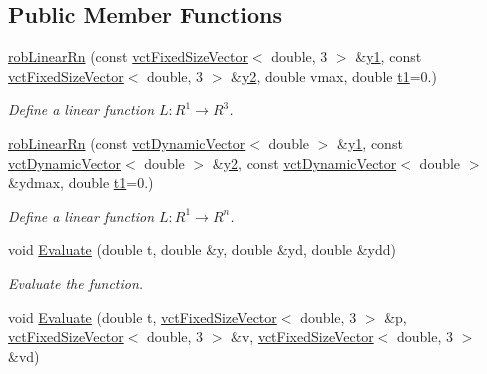 \subsection*{Public Member Functions}
\begin{DoxyCompactItemize}
\item 
\hyperlink{classrob_linear_rn_a85534f130d03d7b490b56248a661621e}{rob\+Linear\+Rn} (const \hyperlink{classvct_fixed_size_vector}{vct\+Fixed\+Size\+Vector}$<$ double, 3 $>$ \&\hyperlink{classrob_function_rn_aadf26230a697fedca000dac29ae27129}{y1}, const \hyperlink{classvct_fixed_size_vector}{vct\+Fixed\+Size\+Vector}$<$ double, 3 $>$ \&\hyperlink{classrob_function_rn_a982a35e7e6f235da34765d3ceeb91109}{y2}, double vmax, double \hyperlink{classrob_function_a9a4b408a3a5a8ae927caec3b6bac36ef}{t1}=0.)
\begin{DoxyCompactList}\small\item\em Define a linear function $L: R^1\rightarrow R^3 $. \end{DoxyCompactList}\item 
\hyperlink{classrob_linear_rn_ab78451ca7c06ad11af49d7fb2e5fadc3}{rob\+Linear\+Rn} (const \hyperlink{classvct_dynamic_vector}{vct\+Dynamic\+Vector}$<$ double $>$ \&\hyperlink{classrob_function_rn_aadf26230a697fedca000dac29ae27129}{y1}, const \hyperlink{classvct_dynamic_vector}{vct\+Dynamic\+Vector}$<$ double $>$ \&\hyperlink{classrob_function_rn_a982a35e7e6f235da34765d3ceeb91109}{y2}, const \hyperlink{classvct_dynamic_vector}{vct\+Dynamic\+Vector}$<$ double $>$ \&ydmax, double \hyperlink{classrob_function_a9a4b408a3a5a8ae927caec3b6bac36ef}{t1}=0.)
\begin{DoxyCompactList}\small\item\em Define a linear function $L: R^1\rightarrow R^n $. \end{DoxyCompactList}\item 
void \hyperlink{classrob_linear_rn_a7d73424d71bc54c111e7a178b66dcd6a}{Evaluate} (double t, double \&y, double \&yd, double \&ydd)
\begin{DoxyCompactList}\small\item\em Evaluate the function. \end{DoxyCompactList}\item 
void \hyperlink{classrob_linear_rn_a1a7e3eddb0068e2d0beaff9c270d3f7d}{Evaluate} (double t, \hyperlink{classvct_fixed_size_vector}{vct\+Fixed\+Size\+Vector}$<$ double, 3 $>$ \&p, \hyperlink{classvct_fixed_size_vector}{vct\+Fixed\+Size\+Vector}$<$ double, 3 $>$ \&v, \hyperlink{classvct_fixed_size_vector}{vct\+Fixed\+Size\+Vector}$<$ double, 3 $>$ \&vd)

\end{DoxyCompactItemize}
